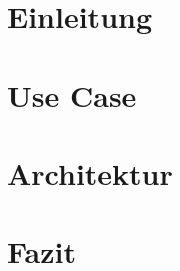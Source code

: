 
\section{Einleitung}

\blindtext[4]

\section{Use Case}

\blindtext[4]

\section{Architektur}

\blindtext[4]

\section{Fazit}

\blindtext[4]